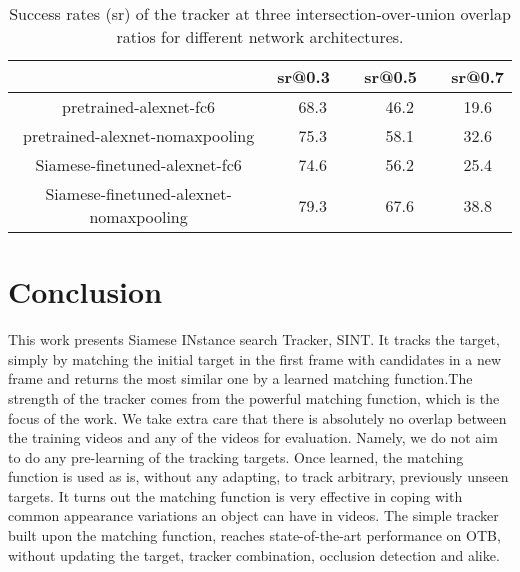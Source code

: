 \documentclass[10pt,twocolumn,letterpaper]{article}
\begin{document}
\begin{table}[h]%
	\centering 
	\caption{ Success rates (sr) of the tracker at three
		intersection-over-union overlap ratios for different network
		architectures.}\label{table2}
	\tabcolsep 0.0001in 

	\begin{tabular} {cccc}
		\hline
		&sr@0.3~~ & sr@0.5~~ &sr@0.7\\
		\hline 
		pretrained-alexnet-fc6& 68.3& 46.2 &19.6\\
		pretrained-alexnet-nomaxpooling& 75.3& 58.1 &32.6\\
		\hline 
		Siamese-finetuned-alexnet-fc6& 74.6 &56.2& 25.4\\
		Siamese-finetuned-alexnet-nomaxpooling &79.3& 67.6 &38.8\\
		\hline
	\end{tabular}
\end{table}
\section{Conclusion}
This work presents Siamese INstance search Tracker, SINT. It tracks the target, simply by matching the initial target in the first frame with candidates in a new frame and returns the most similar one by a learned matching function.The strength of the tracker comes from the powerful matching function, which is the focus of the work. We take extra care that there is absolutely no overlap between the training videos and any of the videos for evaluation. Namely, we do not aim to do any pre-learning of the tracking targets. Once learned, the matching function is used as is, without any adapting, to track arbitrary, previously unseen targets. It turns out the matching function is very effective in coping with common appearance variations an object can have in videos. The simple tracker built upon the matching function, reaches state-of-the-art performance on OTB, without updating the target, tracker combination, occlusion detection and alike. 
{\small

} 
\end{document}

